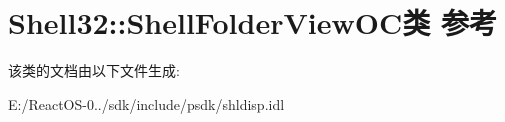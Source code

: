 \hypertarget{class_shell32_1_1_shell_folder_view_o_c}{}\section{Shell32\+:\+:Shell\+Folder\+View\+O\+C类 参考}
\label{class_shell32_1_1_shell_folder_view_o_c}


该类的文档由以下文件生成\+:\begin{DoxyCompactItemize}
\item 
E\+:/\+React\+O\+S-\/0../sdk/include/psdk/shldisp.\+idl\end{DoxyCompactItemize}
